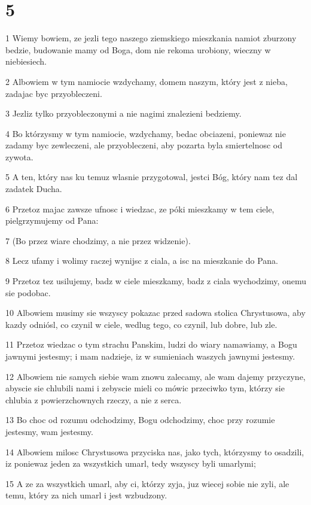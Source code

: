 \chapter{5}

\par 1 Wiemy bowiem, ze jezli tego naszego ziemskiego mieszkania namiot zburzony bedzie, budowanie mamy od Boga, dom nie rekoma urobiony, wieczny w niebiesiech.
\par 2 Albowiem w tym namiocie wzdychamy, domem naszym, który jest z nieba, zadajac byc przyobleczeni.
\par 3 Jezliz tylko przyobleczonymi a nie nagimi znalezieni bedziemy.
\par 4 Bo którzysmy w tym namiocie, wzdychamy, bedac obciazeni, poniewaz nie zadamy byc zewleczeni, ale przyobleczeni, aby pozarta byla smiertelnosc od zywota.
\par 5 A ten, który nas ku temuz wlasnie przygotowal, jestci Bóg, który nam tez dal zadatek Ducha.
\par 6 Przetoz majac zawsze ufnosc i wiedzac, ze póki mieszkamy w tem ciele, pielgrzymujemy od Pana:
\par 7 (Bo przez wiare chodzimy, a nie przez widzenie).
\par 8 Lecz ufamy i wolimy raczej wynijsc z ciala, a isc na mieszkanie do Pana.
\par 9 Przetoz tez usilujemy, badz w ciele mieszkamy, badz z ciala wychodzimy, onemu sie podobac.
\par 10 Albowiem musimy sie wszyscy pokazac przed sadowa stolica Chrystusowa, aby kazdy odniósl, co czynil w ciele, wedlug tego, co czynil, lub dobre, lub zle.
\par 11 Przetoz wiedzac o tym strachu Panskim, ludzi do wiary namawiamy, a Bogu jawnymi jestesmy; i mam nadzieje, iz w sumieniach waszych jawnymi jestesmy.
\par 12 Albowiem nie samych siebie wam znowu zalecamy, ale wam dajemy przyczyne, abyscie sie chlubili nami i zebyscie mieli co mówic przeciwko tym, którzy sie chlubia z powierzchownych rzeczy, a nie z serca.
\par 13 Bo choc od rozumu odchodzimy, Bogu odchodzimy, choc przy rozumie jestesmy, wam jestesmy.
\par 14 Albowiem milosc Chrystusowa przyciska nas, jako tych, którzysmy to osadzili, iz poniewaz jeden za wszystkich umarl, tedy wszyscy byli umarlymi;
\par 15 A ze za wszystkich umarl, aby ci, którzy zyja, juz wiecej sobie nie zyli, ale temu, który za nich umarl i jest wzbudzony.
